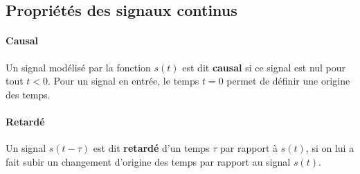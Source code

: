 \subsection{Propriétés des signaux continus}
\paragraph{Causal}
Un signal modélisé par la fonction $s(t)$ est dit \textbf{causal}
si ce signal est nul pour tout $t<0$. Pour un signal en entrée, le temps 
$t=0$ permet de définir une origine des temps.
\begin{figure}[!h]
    \centering
    
\end{figure}
\paragraph{Retardé}
Un signal $s(t-\tau)$ est dit \textbf{retardé} d'un temps $\tau$ 
par rapport à $s(t)$, si on lui a fait subir un changement
d'origine des temps par rapport au signal $s(t)$.
\begin{center}
    
\end{center}
